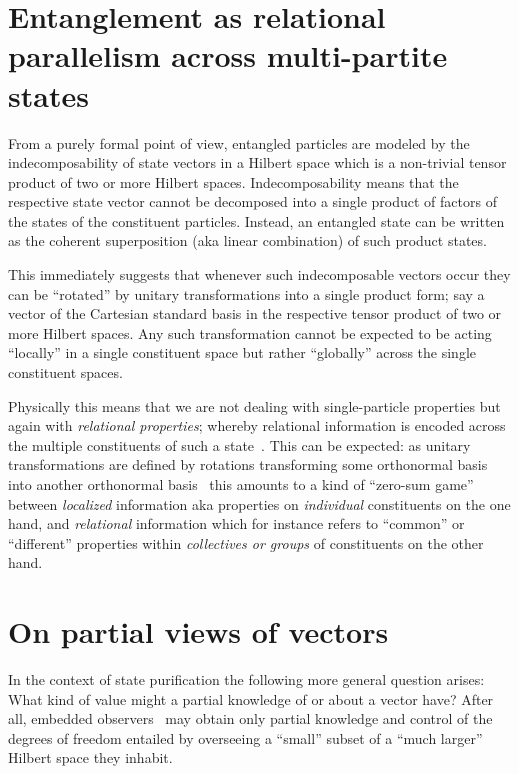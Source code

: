 \documentclass{ws-procs9x6}
\begin{document}
\section{Entanglement as relational parallelism across multi-partite states}

From a purely formal point of view, entangled particles are modeled by the
indecomposability of state vectors in a Hilbert space which is a non-trivial
tensor product of two or more Hilbert spaces.
Indecomposability means that the respective state vector cannot be decomposed into
a single product of factors of the states of the constituent particles.
Instead, an entangled state can be written as the coherent superposition (aka linear combination) of such product states.

This immediately suggests that whenever such indecomposable vectors occur they can be ``rotated'' by unitary transformations
into a single product form; say a vector of the Cartesian standard basis in the respective tensor product of two or more Hilbert spaces.
Any such transformation cannot be expected to be acting ``locally'' in a single constituent space but rather ``globally''
across the single constituent spaces.

Physically this means that we are not dealing with single-particle properties but again with \emph{relational properties};
whereby relational information is encoded across the multiple constituents of such a state~\cite{schrodinger,zeil-99}.
This can be expected: as unitary transformations are defined by
rotations transforming some orthonormal basis into another orthonormal basis~\cite{Schwinger.60}
this amounts to a kind of ``zero-sum game'' between \emph{localized} information aka properties on \emph{individual} constituents
on the one hand, and  \emph{relational} information which for instance refers to ``common'' or ``different'' properties within
\emph{collectives or groups} of constituents on the other hand.


\section{On partial views of vectors}


In the context of state purification the following more general question arises:
What kind of value might a partial knowledge of or about a vector have?
After all, embedded observers~\cite{toffoli:79} may obtain only partial knowledge and control
of the degrees of freedom entailed by overseeing a ``small'' subset of a ``much larger'' Hilbert space they inhabit.
\end{document}
